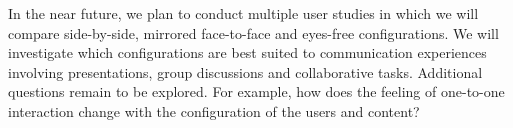 \documentclass[sigchi-a]{acmart}
\begin{document}
In the near future, we plan to conduct multiple user studies in which we will compare side-by-side, mirrored face-to-face and eyes-free configurations. We will 
investigate which configurations are best suited to communication experiences involving presentations, group discussions and collaborative tasks. Additional questions remain to be explored. For example, how does the feeling of one-to-one interaction change with the configuration of the users and content?




\end{document}
